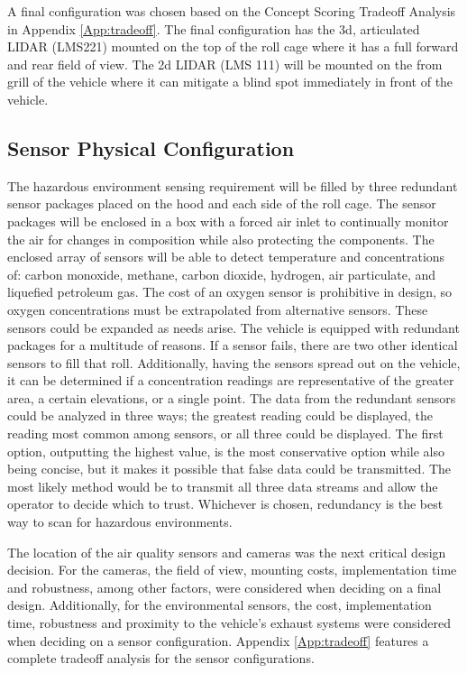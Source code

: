 A final configuration was chosen based on the Concept Scoring Tradeoff Analysis in Appendix \ref{App:tradeoff}. The final configuration has the 3d, articulated LIDAR (LMS221) mounted on the top of the roll cage where it has a full forward and rear field of view. The 2d LIDAR (LMS 111) will be mounted on the from grill of the vehicle where it  can mitigate a blind spot immediately in front of the vehicle. 


\subsection{Sensor Physical Configuration}
The hazardous environment sensing requirement will be filled by three redundant sensor packages placed on the hood and each side of the roll cage. The sensor packages will be enclosed in a box with a forced air inlet to continually monitor the air for changes in composition while also protecting the components. The enclosed array of sensors will be able to detect temperature and concentrations of: carbon monoxide, methane, carbon dioxide, hydrogen, air particulate, and liquefied petroleum gas. The cost of an oxygen sensor is prohibitive in design, so oxygen concentrations must be extrapolated from alternative sensors. These sensors could be expanded as needs arise. The vehicle is equipped with redundant packages for a multitude of reasons. If a sensor fails, there are two other identical sensors to fill that roll. Additionally, having the sensors spread out on the vehicle, it can be determined if a concentration readings are representative of the greater area, a certain elevations, or a single point. The data from the redundant sensors could be analyzed in three ways; the greatest reading could be displayed, the reading most common among sensors, or all three could be displayed. The first option, outputting the highest value, is the most conservative option while also being concise, but it makes it possible that false data could be transmitted. The most likely method would be to transmit all three data streams and allow the operator to decide which to trust. Whichever is chosen, redundancy is the best way to scan for hazardous environments. 

The location of the air quality sensors and cameras was the next critical design decision. For the cameras, the field of view, mounting costs, implementation time and robustness, among other factors, were considered when deciding on a final design. Additionally, for the environmental sensors, the cost, implementation time, robustness and proximity to the vehicle's exhaust systems were considered when deciding on a sensor configuration. Appendix \ref{App:tradeoff} features a complete tradeoff analysis for the sensor configurations. 

